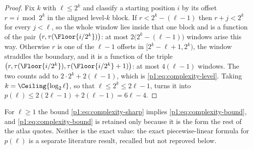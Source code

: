 \documentclass[11pt,oneside]{article}
\numberwithin{equation}{section}
\theoremstyle{definition}
\theoremstyle{remark}
\begin{document}
\begin{proof}
Fix \(k\) with \(\ell\le2^k\) and classify a starting position \(i\)
by its offset \(r=i\bmod2^k\) in the aligned level-\(k\) block.  If
\(r<2^k-(\ell-1)\) then \(r+j<2^k\) for every \(j<\ell\), so the whole
window lies inside that one block and is a function of the pair
\(\bigl(r,\tau(\Floor{i/2^k})\bigr)\): at most
\(2\bigl(2^k-(\ell-1)\bigr)\) windows arise this way.  Otherwise \(r\)
is one of the \(\ell-1\) offsets in \([2^k-\ell+1,2^k)\), the window
straddles the boundary, and it is a function of the triple
\(\bigl(r,\tau(\Floor{i/2^k}),\tau(\Floor{i/2^k}+1)\bigr)\):
at most \(4(\ell-1)\) windows.  The two counts
add to \(2\cdot2^k+2(\ell-1)\), which is \eqref{p1:eq:complexity-level}.
Taking \(k=\Ceiling{\log_2\ell}\), so that \(\ell\le2^k\le2\ell-1\),
turns it into \(p(\ell)\le2(2\ell-1)+2(\ell-1)=6\ell-4\).
\end{proof}

For \(\ell\ge1\) the bound \eqref{p1:eq:complexity-sharp} implies
\eqref{p1:eq:complexity-bound}, and \eqref{p1:eq:complexity-bound} is
retained only because it is the form the rest of the atlas quotes.
Neither is the exact value: the exact piecewise-linear formula for
\(p(\ell)\) is a separate literature result, recalled but not
reproved below.
\end{document}
